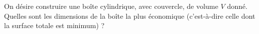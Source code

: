\begin{exercice}\label{exo3}

On désire construire une boîte cylindrique, avec couvercle, de volume $V$ donné. Quelles sont les dimensions de la boîte la plus économique (c'est-à-dire celle dont la surface totale est minimum) ?

\end{exercice}

